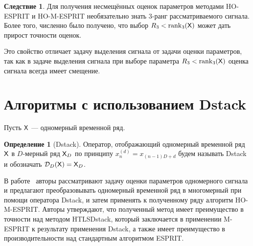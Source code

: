 \documentclass[specialist,
  substylefile=spbu_report.rtx,
subf,href,colorlinks=true, 12pt]{disser}
\theoremstyle{plain}
\theoremstyle{definition}
\newtheorem{definition}{Определение}[section]
\newtheorem*{corollary}{Следствие}
\theoremstyle{remark}
\begin{document}
\begin{corollary}
  Для получения несмещённых оценок параметров методами HO-ESPRIT и HO-M-ESPRIT
  необязательно знать 3-ранг рассматриваемого сигнала.
  Более того, численно было получено, что выбор $R_3 <
  \operatorname{rank}_3(\mathsf{X})$
  может дать прирост точности оценок.
\end{corollary}

Это свойство отличает задачу выделения сигнала от задачи оценки
параметров, так как в задаче выделения сигнала при выборе параметра $R_3 <
\operatorname{rank}_3(\mathsf{X})$ оценка сигнала всегда имеет смещение.

\section{Алгоритмы с использованием Dstack}\label{sec:dstack}
Пусть $\mathsf{X}$ --- одномерный временной ряд.
\begin{definition}[Dstack]
  Оператор, отображающий одномерный временной ряд $\mathsf{X}$ в $D$-мерный ряд $\mathsf{X}_D$
  по принципу $x_n^{(d)} = x_{(n-1)D + d}$ будем называть Dstack и
  обозначать $\mathcal{D}_D(\mathsf{X}) = \mathsf{X}_D$.
\end{definition}
В работе~\cite{Papy2009} авторы рассматривают задачу оценки
параметров одномерного сигнала и предлагают преобразовывать
одномерный временной ряд в многомерный при помощи оператора Dstack, и
затем применять к полученному ряду алгоритм HO-M-ESPRIT.
Авторы утверждают, что полученный метод имеет преимущество в точности над
методом HTLSDstack, который заключается в применении M-ESPRIT к
результату применения Dstack, а также имеет преимущество в
производительности над стандартным алгоритмом ESPRIT.
\end{document}
